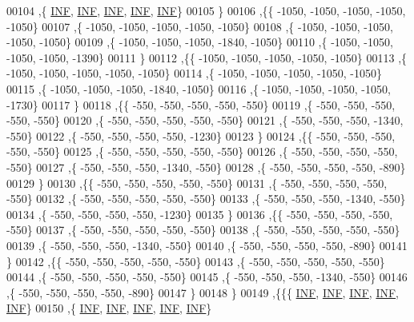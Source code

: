 \begin{DoxyCode}
00104   ,\{   \mbox{\hyperlink{energy__const_8h_a12c2040f25d8e3a7b9e1c2024c618cb6}{INF}},   \mbox{\hyperlink{energy__const_8h_a12c2040f25d8e3a7b9e1c2024c618cb6}{INF}},   \mbox{\hyperlink{energy__const_8h_a12c2040f25d8e3a7b9e1c2024c618cb6}{INF}},   \mbox{\hyperlink{energy__const_8h_a12c2040f25d8e3a7b9e1c2024c618cb6}{INF}},   \mbox{\hyperlink{energy__const_8h_a12c2040f25d8e3a7b9e1c2024c618cb6}{INF}}\}
00105   \}
00106  ,\{\{ -1050, -1050, -1050, -1050, -1050\}
00107   ,\{ -1050, -1050, -1050, -1050, -1050\}
00108   ,\{ -1050, -1050, -1050, -1050, -1050\}
00109   ,\{ -1050, -1050, -1050, -1840, -1050\}
00110   ,\{ -1050, -1050, -1050, -1050, -1390\}
00111   \}
00112  ,\{\{ -1050, -1050, -1050, -1050, -1050\}
00113   ,\{ -1050, -1050, -1050, -1050, -1050\}
00114   ,\{ -1050, -1050, -1050, -1050, -1050\}
00115   ,\{ -1050, -1050, -1050, -1840, -1050\}
00116   ,\{ -1050, -1050, -1050, -1050, -1730\}
00117   \}
00118  ,\{\{  -550,  -550,  -550,  -550,  -550\}
00119   ,\{  -550,  -550,  -550,  -550,  -550\}
00120   ,\{  -550,  -550,  -550,  -550,  -550\}
00121   ,\{  -550,  -550,  -550, -1340,  -550\}
00122   ,\{  -550,  -550,  -550,  -550, -1230\}
00123   \}
00124  ,\{\{  -550,  -550,  -550,  -550,  -550\}
00125   ,\{  -550,  -550,  -550,  -550,  -550\}
00126   ,\{  -550,  -550,  -550,  -550,  -550\}
00127   ,\{  -550,  -550,  -550, -1340,  -550\}
00128   ,\{  -550,  -550,  -550,  -550,  -890\}
00129   \}
00130  ,\{\{  -550,  -550,  -550,  -550,  -550\}
00131   ,\{  -550,  -550,  -550,  -550,  -550\}
00132   ,\{  -550,  -550,  -550,  -550,  -550\}
00133   ,\{  -550,  -550,  -550, -1340,  -550\}
00134   ,\{  -550,  -550,  -550,  -550, -1230\}
00135   \}
00136  ,\{\{  -550,  -550,  -550,  -550,  -550\}
00137   ,\{  -550,  -550,  -550,  -550,  -550\}
00138   ,\{  -550,  -550,  -550,  -550,  -550\}
00139   ,\{  -550,  -550,  -550, -1340,  -550\}
00140   ,\{  -550,  -550,  -550,  -550,  -890\}
00141   \}
00142  ,\{\{  -550,  -550,  -550,  -550,  -550\}
00143   ,\{  -550,  -550,  -550,  -550,  -550\}
00144   ,\{  -550,  -550,  -550,  -550,  -550\}
00145   ,\{  -550,  -550,  -550, -1340,  -550\}
00146   ,\{  -550,  -550,  -550,  -550,  -890\}
00147   \}
00148  \}
00149 ,\{\{\{   \mbox{\hyperlink{energy__const_8h_a12c2040f25d8e3a7b9e1c2024c618cb6}{INF}},   \mbox{\hyperlink{energy__const_8h_a12c2040f25d8e3a7b9e1c2024c618cb6}{INF}},   \mbox{\hyperlink{energy__const_8h_a12c2040f25d8e3a7b9e1c2024c618cb6}{INF}},   \mbox{\hyperlink{energy__const_8h_a12c2040f25d8e3a7b9e1c2024c618cb6}{INF}},   \mbox{\hyperlink{energy__const_8h_a12c2040f25d8e3a7b9e1c2024c618cb6}{INF}}\}
00150   ,\{   \mbox{\hyperlink{energy__const_8h_a12c2040f25d8e3a7b9e1c2024c618cb6}{INF}},   \mbox{\hyperlink{energy__const_8h_a12c2040f25d8e3a7b9e1c2024c618cb6}{INF}},   \mbox{\hyperlink{energy__const_8h_a12c2040f25d8e3a7b9e1c2024c618cb6}{INF}},   \mbox{\hyperlink{energy__const_8h_a12c2040f25d8e3a7b9e1c2024c618cb6}{INF}},   \mbox{\hyperlink{energy__const_8h_a12c2040f25d8e3a7b9e1c2024c618cb6}{INF}}\}

\end{DoxyCode}
